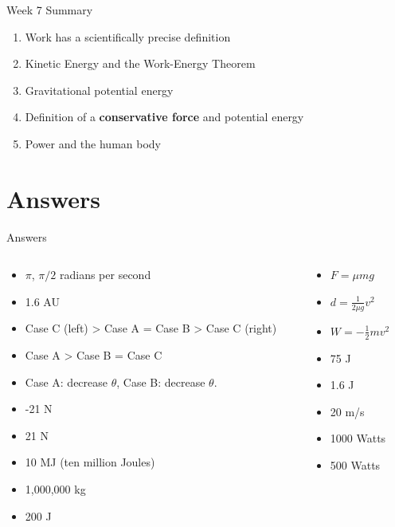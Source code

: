 \documentclass{beamer}
\begin{document}
\begin{frame}{Week 7 Summary}
\begin{enumerate}
\item \alert{Work} has a scientifically precise definition
\item Kinetic Energy and the \alert{Work-Energy Theorem}
\item Gravitational potential energy
\item Definition of a \textbf{conservative force} and potential energy
\item Power and the human body
\end{enumerate}
\end{frame}

\section{Answers}

\begin{frame}{Answers}
\begin{columns}[T]
\begin{column}{0.5\textwidth}
\begin{itemize}
\item $\pi$, $\pi/2$ radians per second
\item 1.6 AU
\item Case C (left) > Case A = Case B > Case C (right)
\item Case A > Case B = Case C
\item Case A: decrease $\theta$, Case B: decrease $\theta$.
\item -21 N
\item 21 N
\item 10 MJ (ten million Joules)
\item 1,000,000 kg
\item 200 J
\end{itemize}
\end{column}
\begin{column}{0.5\textwidth}
\begin{itemize}
\item $F = \mu m g$
\item $d = \frac{1}{2\mu g} v^2$
\item $W = -\frac{1}{2} m v^2$
\item 75 J
\item 1.6 J
\item 20 m/s
\item 1000 Watts
\item 500 Watts
\end{itemize}
\end{column}
\end{columns}
\end{frame}
\end{document}
